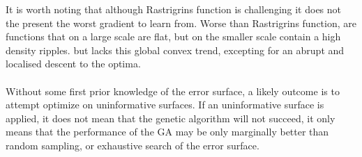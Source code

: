    It is worth noting that although Rastrigrins function is challenging it does not the present the worst gradient to learn from. Worse than Rastrigrins function, are functions that on a large scale are flat, but on the smaller scale contain a high density ripples.
   but lacks this global convex trend, excepting for an abrupt and localised descent to the optima.\\ 
   \\
   Without some first prior knowledge of the error surface, a likely outcome is to attempt optimize on uninformative surfaces. If an uninformative surface is applied, it does not mean that the genetic algorithm will not succeed, it only means that the performance of the GA may be only marginally better than random sampling, or exhaustive search of the error surface.\\
   \\
{ \hspace*{\fill} \\}      

